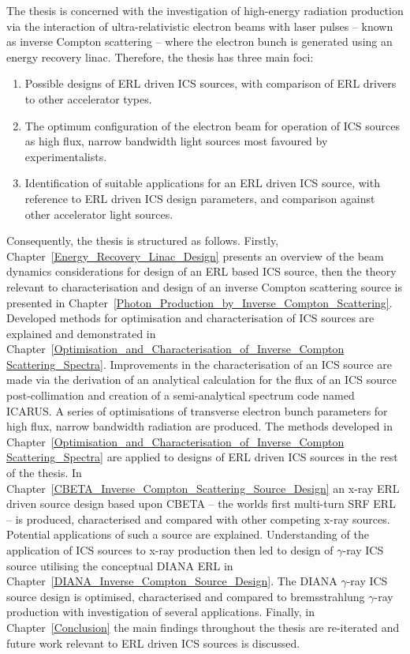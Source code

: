 \documentclass[../main.tex]{subfiles}
\begin{document}
The thesis is concerned with the investigation of high-energy radiation production via the interaction of ultra-relativistic electron beams with laser pulses -- known as inverse Compton scattering -- where the electron bunch is generated using an energy recovery linac. Therefore, the thesis has three main foci: 
\begin{enumerate}
    \item{Possible designs of ERL driven ICS sources, with comparison of ERL drivers to other accelerator types.}
    \item{The optimum configuration of the electron beam for operation of ICS sources as high flux, narrow bandwidth light sources most favoured by experimentalists.}
    \item{Identification of suitable applications for an ERL driven ICS source, with reference to ERL driven ICS design parameters, and comparison against other accelerator light sources.}
\end{enumerate}

Consequently, the thesis is structured as follows. Firstly,  Chapter~\ref{Energy_Recovery_Linac_Design} presents an overview of the beam dynamics considerations for design of an ERL based ICS source, then the theory relevant to characterisation and design of an inverse Compton scattering source is presented in Chapter~\ref{Photon_Production_by_Inverse_Compton_Scattering}. Developed methods for optimisation and characterisation of ICS sources are explained and demonstrated in Chapter~\ref{Optimisation_and_Characterisation_of_Inverse_Compton Scattering_Spectra}. Improvements in the characterisation of an ICS source are made via the derivation of an analytical calculation for the flux of an ICS source post-collimation and creation of a semi-analytical spectrum code named \textsc{ICARUS}. A series of optimisations of transverse electron bunch parameters for high flux, narrow bandwidth radiation are produced. The methods developed in Chapter~\ref{Optimisation_and_Characterisation_of_Inverse_Compton Scattering_Spectra} are applied to designs of ERL driven ICS sources in the rest of the thesis. In Chapter~\ref{CBETA_Inverse_Compton_Scattering_Source_Design} an x-ray ERL driven source design based upon CBETA -- the worlds first multi-turn SRF ERL -- is produced, characterised and compared with other competing x-ray sources. Potential applications of such a source are explained. Understanding of the application of ICS sources to x-ray production then led to design of $\gamma$-ray ICS source utilising the conceptual DIANA ERL in Chapter~\ref{DIANA_Inverse_Compton_Source_Design}. The DIANA $\gamma$-ray ICS source design is optimised, characterised and compared to bremsstrahlung $\gamma$-ray production with investigation of several applications. Finally, in Chapter~\ref{Conclusion} the main findings throughout the thesis are re-iterated and future work relevant to ERL driven ICS sources is discussed.       
\end{document}
